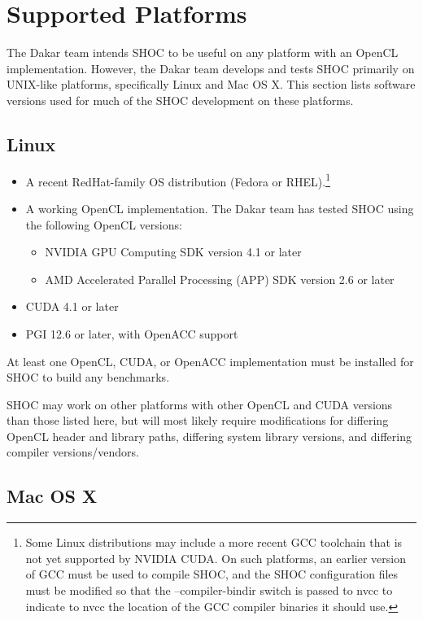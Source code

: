 \documentclass[11pt]{article}
\begin{document}
\section{Supported Platforms}\label{sec:supported}

The Dakar team intends SHOC to be useful on any platform with an
OpenCL implementation. However, the Dakar team develops and tests
SHOC primarily on UNIX-like platforms, specifically Linux and
Mac OS X.
This section lists software versions used for much of the SHOC development
on these platforms.

\subsection{Linux}

\begin{itemize}
\item A recent RedHat-family OS distribution (Fedora or RHEL).\footnote{
Some Linux distributions may include a more recent GCC toolchain that is
not yet supported by NVIDIA CUDA.  On such platforms, an earlier version of GCC
must be used to compile SHOC, and the SHOC configuration files must be
modified so that the --compiler-bindir switch is passed to nvcc to 
indicate to nvcc the location of the GCC compiler binaries it should use.}
\item A working OpenCL implementation. The Dakar team has tested SHOC
using the following OpenCL versions:
    \begin{itemize}
        \item NVIDIA GPU Computing SDK version 4.1 or later
        \item AMD Accelerated Parallel Processing (APP) SDK version 2.6 or later
    \end{itemize}
\item CUDA 4.1 or later
\item PGI 12.6 or later, with OpenACC support
\end{itemize}

At least one OpenCL, CUDA, or OpenACC implementation must be installed for
SHOC to build any benchmarks.

SHOC may work on other platforms with other OpenCL and CUDA versions
than those listed here, but will most likely require modifications for
differing OpenCL header and library paths, differing system library versions,
and differing compiler versions/vendors.

\subsection{Mac OS X}
\end{document}
